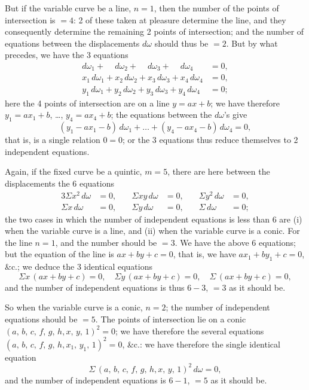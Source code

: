 \documentclass[11pt,a4paper]{book}
\providecommand{\between}{,}
\begin{document}
But if the variable curve be a line, $n=1$, then the number of the points of intersection is $=4$: 2 of these taken at pleasure determine the line, and they consequently determine the remaining 2 points of intersection; and the number of equations between the displacements $d\omega$ should thus be $=2$. But by what precedes, we have the 3 equations
\begin{align*}
d\omega_1 + \phantom{x_1}\,d\omega_2 + \phantom{x_2}\,d\omega_3 + \phantom{x_3}\,d\omega_4 &= 0,\\
x_1\,d\omega_1 + x_2\,d\omega_2 + x_3\,d\omega_3 + x_4\,d\omega_4 &= 0,\\
y_1\,d\omega_1 + y_2\,d\omega_2 + y_3\,d\omega_3 + y_4\,d\omega_4 &= 0;
\end{align*}
here the 4 points of intersection are on a line $y = ax + b$; we have therefore $y_1 = ax_1 + b$, \ldots, $y_4 = ax_4 + b$; the equations between the $d\omega$'s give
\[
(y_1 - ax_1 - b)\,d\omega_1 + \ldots + (y_4 - ax_4 - b)\,d\omega_4 = 0,
\]
that is, is a single relation $0=0$; or the 3 equations thus reduce themselves to 2 independent equations.

Again, if the fixed curve be a quintic, $m=5$, there are here between the displacements the 6 equations
\begin{alignat*}{3}
\Sigma x^2\,d\omega &= 0,\quad & \Sigma xy\,d\omega &= 0,\quad & \Sigma y^2\,d\omega &= 0,\\
\Sigma x\,d\omega &= 0,\quad & \Sigma y\,d\omega &= 0,\quad & \Sigma\,d\omega &= 0;
\end{alignat*}
the two cases in which the number of independent equations is less than 6 are (i) when the variable curve is a line, and (ii) when the variable curve is a conic. For the line $n=1$, and the number should be $=3$. We have the above 6 equations; but the equation of the line is $ax + by + c = 0$, that is, we have $ax_1 + by_1 + c = 0$, \&c.; we deduce the 3 identical equations
\[
\Sigma x\,(ax+by+c) = 0,\quad \Sigma y\,(ax+by+c) = 0,\quad \Sigma\,(ax+by+c) = 0,
\]
and the number of independent equations is thus $6-3$, $=3$ as it should be.

So when the variable curve is a conic, $n=2$; the number of independent equations should be $=5$. The points of intersection lie on a conic $(a,\,b,\,c,\,f,\,g,\,h\!\between\!x,\,y,\,1)^2 = 0$; we have therefore the several equations $(a,\,b,\,c,\,f,\,g,\,h\!\between\!x_1,\,y_1,\,1)^2 = 0$, \&c.: we have therefore the single identical equation
\[
\Sigma\,(a,\,b,\,c,\,f,\,g,\,h\!\between\!x,\,y,\,1)^2\,d\omega = 0,
\]
and the number of independent equations is $6-1$, $=5$ as it should be.
\end{document}
